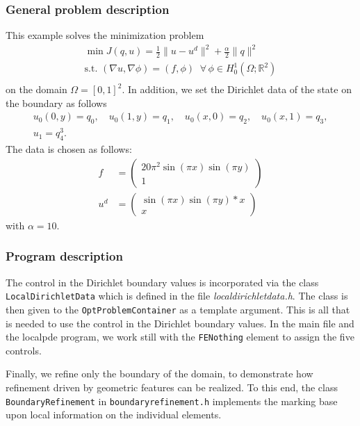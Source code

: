 \subsubsection{General problem description}
This example solves the minimization problem
\begin{gather*}
\min J(q,u) = \frac{1}{2} \|u-u^d\|^2 + \frac{\alpha}{2}\|q\|^2\\
\text{s.t. } (\nabla u,\nabla \phi) = (f,\phi)\;\;\forall\,\phi \in H^1_0(\Omega; \mathbb R^2)\\
\end{gather*}
on the domain $\Omega = [0,1]^2$. In addition, we set the Dirichlet data of the state on the boundary as follows
\begin{gather*}
 u_0(0,y) = q_0,\quad u_0(1,y) = q_1,\quad u_0(x,0) = q_2,\quad u_0(x,1) = q_3,\\
 u_1 = q_4^3.
\end{gather*}
The data is chosen as follows:
\begin{align*}
 f &= \left(\begin{matrix}20\pi^2  \sin( \pi x) \sin(\pi y)\\1 \end{matrix}\right)\\
 u^d&= \left(\begin{matrix}\sin( \pi x) \sin(\pi y)*x\\x \end{matrix}\right)
\end{align*}
with $\alpha = 10$.
\subsubsection{Program description}
The control in the Dirichlet boundary values is incorporated via the
class \texttt{LocalDirichletData} which is defined in the
file \textit{localdirichletdata.h}. The class is then given to
the \texttt{OptProblemContainer} as a template argument. This is all that is
needed to use the control in the Dirichlet boundary values. 
In the main file and the localpde program, we work still with the 
\texttt{FE\underline{}Nothing} element to assign the five controls.

Finally, we refine only the boundary of the domain, to demonstrate how
refinement driven by geometric features can be realized. To this end,
the class \texttt{BoundaryRefinement} in \texttt{boundaryrefinement.h}
implements the marking base upon local information on the individual elements.